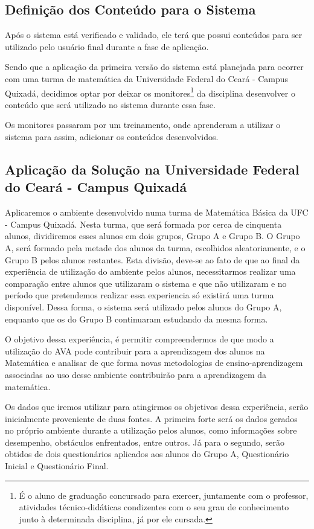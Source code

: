 \subsection{Definição dos Conteúdo para o Sistema}

Após o sistema está verificado e validado, ele terá que possui conteúdos para ser utilizado pelo usuário final durante a fase de aplicação. 

Sendo que a aplicação da primeira versão do sistema está planejada para ocorrer com uma turma de matemática da Universidade Federal do Ceará - Campus Quixadá, decidimos optar por deixar os monitores\footnote{É o aluno de graduação concursado para exercer, juntamente com o professor, atividades técnico-didáticas condizentes com o seu grau de conhecimento junto à determinada disciplina, já por ele cursada.} da disciplina desenvolver o conteúdo que será utilizado no sistema durante essa fase. 

Os monitores passaram por um treinamento, onde aprenderam a utilizar o sistema para assim, adicionar os conteúdos desenvolvidos.

\subsection{Aplicação da Solução na Universidade Federal do Ceará - Campus Quixadá}

Aplicaremos o ambiente desenvolvido numa turma de Matemática Básica da UFC - Campus Quixadá. Nesta turma, que será formada por cerca de cinquenta alunos, dividiremos esses alunos em dois grupos, Grupo A e Grupo B. O Grupo A, será formado pela metade dos alunos da turma, escolhidos aleatoriamente, e o Grupo B pelos alunos restantes. Esta divisão, deve-se ao fato de que ao final da experiência de utilização do ambiente pelos alunos, necessitarmos realizar uma comparação entre alunos que utilizaram o sistema e que não utilizaram e no período que pretendemos realizar essa experiencia só existirá uma turma disponível. Dessa forma, o sistema será utilizado pelos alunos do Grupo A, enquanto que os do Grupo B continuaram estudando da mesma forma. 

O objetivo dessa experiência, é permitir compreendermos de que modo a utilização do AVA pode contribuir para a aprendizagem dos alunos na Matemática e analisar de que forma novas metodologias de ensino-aprendizagem associadas ao uso desse ambiente contribuirão para a aprendizagem da matemática.

Os dados que iremos utilizar para atingirmos os objetivos dessa experiência, serão inicialmente proveniente de duas fontes. A primeira forte será os dados gerados no próprio ambiente durante a utilização pelos alunos, como informações sobre desempenho, obstáculos enfrentados, entre outros. Já para o segundo, serão obtidos de dois questionários aplicados aos alunos do Grupo A, Questionário Inicial e Questionário Final. 


